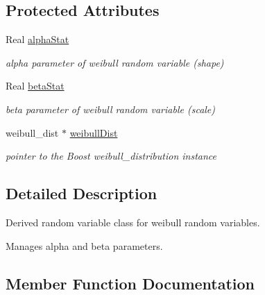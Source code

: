 \subsection*{Protected Attributes}
\begin{DoxyCompactItemize}
\item 
Real \hyperlink{classPecos_1_1WeibullRandomVariable_aa48da95b9214d9cf933e1d4625e32e84}{alpha\+Stat}\label{classPecos_1_1WeibullRandomVariable_aa48da95b9214d9cf933e1d4625e32e84}

\begin{DoxyCompactList}\small\item\em alpha parameter of weibull random variable (shape) \end{DoxyCompactList}\item 
Real \hyperlink{classPecos_1_1WeibullRandomVariable_a838d220373c3360feec45e853b0daaac}{beta\+Stat}\label{classPecos_1_1WeibullRandomVariable_a838d220373c3360feec45e853b0daaac}

\begin{DoxyCompactList}\small\item\em beta parameter of weibull random variable (scale) \end{DoxyCompactList}\item 
weibull\+\_\+dist $\ast$ \hyperlink{classPecos_1_1WeibullRandomVariable_a6c5e66e30d31c5cf960c95463316e254}{weibull\+Dist}\label{classPecos_1_1WeibullRandomVariable_a6c5e66e30d31c5cf960c95463316e254}

\begin{DoxyCompactList}\small\item\em pointer to the Boost weibull\+\_\+distribution instance \end{DoxyCompactList}\end{DoxyCompactItemize}


\subsection{Detailed Description}
Derived random variable class for weibull random variables. 

Manages alpha and beta parameters. 

\subsection{Member Function Documentation}
